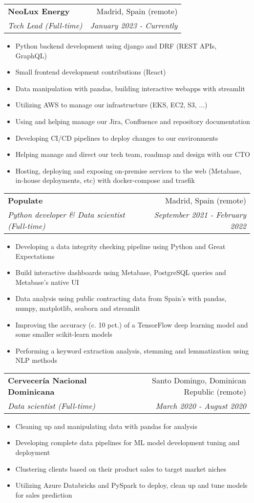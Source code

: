 \documentclass[a4paper,20pt]{article}
\makeatletter
\newcommand{\resumeSubheading}[4]{
  \vspace{-1pt}\item
    \begin{tabular*}{0.97\textwidth}{l@{\extracolsep{\fill}}r}
      \textbf{#1} & #2 \\
      \textit{#3} & \textit{#4} \\
    \end{tabular*}\vspace{-5pt}
}
\makeatother
\begin{document}
  \resumeSubheading{NeoLux Energy}{Madrid, Spain (remote)}
    {Tech Lead (Full-time)}{January 2023 - Currently}
\begin{itemize} \itemsep-0.24em
  \item Python backend development using django and DRF (REST APIs, GraphQL)
  \item Small frontend development contributions (React)
  \item Data manipulation with pandas, building interactive webapps with streamlit
  \item Utilizing AWS to manage our infrastructure (EKS, EC2, S3, ...)
  \item Using and helping manage our Jira, Confluence and repository documentation
  \item Developing CI/CD pipelines to deploy changes to our environments
  \item Helping manage and direct our tech team, roadmap and design with our CTO
  \item Hosting, deploying and exposing on-premise services to the web (Metabase, in-house deployments, etc) with docker-compose and traefik
\end{itemize}
\vspace{-3pt}
  \resumeSubheading{Populate}{Madrid, Spain (remote)}
    {Python developer \& Data scientist (Full-time)}{September 2021 - February 2022}
\begin{itemize} \itemsep-0.24em
  \item Developing a data integrity checking pipeline using Python and Great Expectations
  \item Build interactive dashboards using Metabase, PostgreSQL queries and Metabase's native UI
  \item Data analysis using public contracting data from Spain's with pandas, numpy, matplotlib, seaborn and streamlit
  \item Improving the accuracy (c. 10 pct.) of a TensorFlow deep learning model and some smaller scikit-learn models
  \item Performing a keyword extraction analysis, stemming and lemmatization using NLP methods
\end{itemize}
\vspace{-3pt}
  \resumeSubheading{Cervecería Nacional Dominicana}{Santo Domingo, Dominican Republic (remote)}
    {Data scientist (Full-time)}{March 2020 - August 2020}
\begin{itemize} \itemsep-0.24em
  \item Cleaning up and manipulating data with pandas for analysis
  \item Developing complete data pipelines for ML model development tuning and deployment
  \item Clustering clients based on their product sales to target market niches
  \item Utilizing Azure Databricks and PySpark to deploy, clean up and tune models for sales prediction
\end{itemize}
\end{document}
